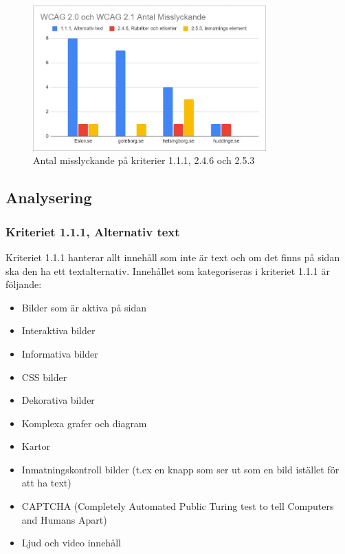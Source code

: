\documentclass[11p]{article}
\begin{document}
    \begin{figure}[hbt!]
        \includegraphics[width=0.8\textwidth]{../images/antalmisslyckande.jpg}
        \caption{ Antal misslyckande på kriterier 1.1.1, 2.4.6 och 2.5.3 }
    \end{figure}

    \subsection{Analysering}
    
    \subsubsection{Kriteriet 1.1.1, Alternativ text}
    Kriteriet 1.1.1 hanterar allt innehåll som inte är text och om det finns på sidan ska den ha ett textalternativ.
    Innehållet som kategoriseras i kriteriet 1.1.1 är följande:

    \begin{itemize}
        \item Bilder som är aktiva på sidan
        \item Interaktiva bilder
        \item Informativa bilder
        \item CSS bilder
        \item Dekorativa bilder
        \item Komplexa grafer och diagram
        \item Kartor
        \item Inmatningskontroll bilder (t.ex en knapp som ser ut som en bild istället för att ha text)
        \item CAPTCHA (Completely Automated Public Turing test to tell Computers and Humans Apart)
        \item Ljud och video innehåll
    \end{itemize}
\end{document}
